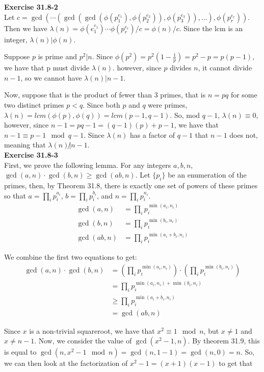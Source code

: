 \documentclass{article}
\begin{document}
\noindent\textbf{Exercise 31.8-2}\\

Let $c = \gcd( \cdots (\gcd(\gcd(\phi(p_1^{e_1}),\phi(p_2^{e_2})), \phi(p_3^{e_3})), \ldots),\phi(p_r^{e_r}))$.  Then we have $\lambda(n) = \phi(e_1^{e_1}) \cdots \phi(p_r^{e_r}) / c = \phi(n)/c$.  Since the lcm is an integer, $\lambda(n) | \phi(n)$.  

Suppose $p$ is prime and $p^2 | n$. Since $\phi(p^2) = p^2( 1 - \frac{1}{p}) = p^2 - p = p(p-1)$, we have that p must divide $\lambda(n)$. however, since $p$ divides $n$, it cannot divide $n-1$, so we cannot have $\lambda(n) | n-1$.

Now, suppose that is the product of fewer than $3$ primes, that is $n = pq$ for some two distinct primes $p<q$. Since both $p$ and $q$ were primes, $\lambda(n) = lcm(\phi(p),\phi(q)) = lcm(p-1,q-1)$. So, mod $q-1$, $\lambda(n) \equiv 0$, however, since $n-1 = pq-1 = (q-1)(p) + p-1$, we have that $n-1 \equiv p-1 \mod q-1$. Since $\lambda(n)$ has a factor of $q-1$ that $n-1$ does not, meaning that $\lambda(n) \not | n-1$.\\

\noindent\textbf{Exercise 31.8-3}\\

First, we prove the following lemma. For any integers $a,b,n$, $\gcd(a,n) \cdot \gcd(b,n) \ge \gcd(ab,n)$. Let $\{p_i\}$ be an enumeration of the primes, then, by Theorem 31.8, there is exactly one set of powers of these primes so that $a = \prod_{i} p_i^{a_i}$, $b = \prod_{i} p_i^{b_i}$, and $n = \prod_{i} p_i^{n_i}$. 
\begin{align*}
\gcd(a,n) &= \prod_i p_i^{\min(a_i,n_i)}\\
\gcd(b,n) &= \prod_i p_i^{\min(b_i,n_i)}\\
\gcd(ab,n) &= \prod_i p_i^{\min(a_i+b_i,n_i)}
\end{align*}

We combine the first two equations to get:
\begin{align*}
\gcd(a,n)\cdot \gcd(b,n) &= \left(\prod_i p_i^{\min(a_i,n_i)}\right) \cdot\left( \prod_i p_i^{\min(b_i,n_i)}\right)\\
 &= \prod_i p_i^{\min(a_i,n_i) + \min(b_i,n_i)}\\
 &\ge \prod_i p_i^{\min(a_i+b_i,n_i)}\\
 &= \gcd(ab,n)
\end{align*}


Since $x$ is a non-trivial squareroot, we have that $x^2 \equiv 1 \mod n$, but $x\neq 1$ and $x\neq n-1$. Now, we consider the value of $\gcd(x^2-1,n)$. By theorem 31.9, this is equal to $\gcd(n, x^2-1\mod n) = \gcd(n,1-1) = \gcd(n,0) = n$. So, we can then look at the factorization of $x^2-1 = (x+1)(x-1)$ to get that
\end{document}

